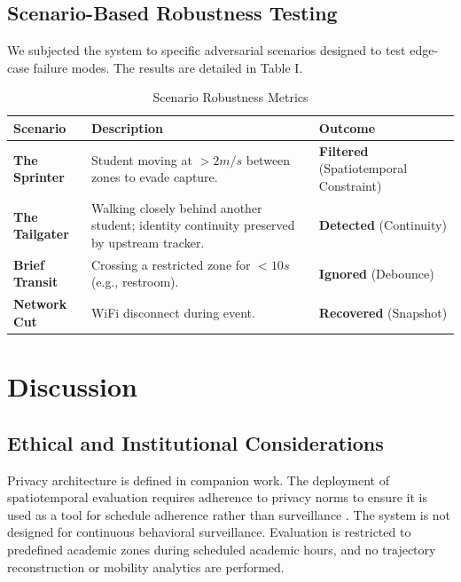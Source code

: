 \documentclass[conference]{IEEEtran}
\begin{document}
\subsection{Scenario-Based Robustness Testing}
We subjected the system to specific adversarial scenarios designed to test edge-case failure modes. The results are detailed in Table I.

\begin{table}[H]
\caption{Scenario Robustness Metrics}
\begin{center}
\begin{tabular}{|l|p{2.8cm}|p{2.2cm}|}
\hline
\textbf{Scenario} & \textbf{Description} & \textbf{Outcome} \\
\hline
\textbf{The Sprinter} & Student moving at $>2m/s$ between zones to evade capture. & \textbf{Filtered} (Spatiotemporal Constraint) \\
\hline
\textbf{The Tailgater} & Walking closely behind another student; identity continuity preserved by upstream tracker. & \textbf{Detected} (Continuity) \\
\hline
\textbf{Brief Transit} & Crossing a restricted zone for $<10s$ (e.g., restroom). & \textbf{Ignored} (Debounce) \\
\hline
\textbf{Network Cut} & WiFi disconnect during event. & \textbf{Recovered} (Snapshot) \\
\hline
\end{tabular}
\end{center}
\label{tab:scenarios}
\end{table}

\section{Discussion}

\subsection{Ethical and Institutional Considerations}
Privacy architecture is defined in companion work. The deployment of spatiotemporal evaluation requires adherence to privacy norms to ensure it is used as a tool for schedule adherence rather than surveillance \cite{b19}. The system is not designed for continuous behavioral surveillance. Evaluation is restricted to predefined academic zones during scheduled academic hours, and no trajectory reconstruction or mobility analytics are performed.
\end{document}
